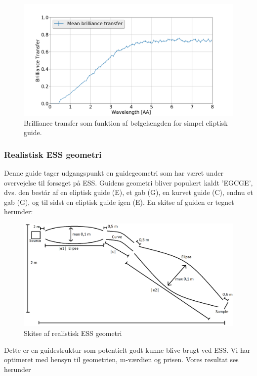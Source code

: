 \documentclass[12pt,oneside,a4paper]{article}
\begin{document}
{{{{{\begin{figure}[H]
\centering
\includegraphics[width=1\textwidth]{optimized_mean_4.png}
\caption{Brilliance transfer som funktion af bølgelængden for simpel eliptisk guide.}
\end{figure}




\subsubsection{Realistisk ESS geometri}
Denne guide tager udgangspunkt en guidegeometri som har været under overvejelse til forsøget på ESS. Guidens geometri bliver populært kaldt 'EGCGE', dvs. den består af en eliptisk guide (E), et gab (G), en kurvet guide (C), endnu et gab (G), og til sidst en eliptisk guide igen (E). En skitse af guiden er tegnet herunder:

\begin{figure}[H]
\centering
\includegraphics[width=1\textwidth]{EGCGE.png}
\caption{Skitse af realistisk ESS geometri}
\end{figure}

Dette er en guidestruktur som potentielt godt kunne blive brugt ved ESS. Vi har optimeret med hensyn til geometrien, m-værdien og prisen. Vores resultat ses herunder

}}}}}
\end{document}
